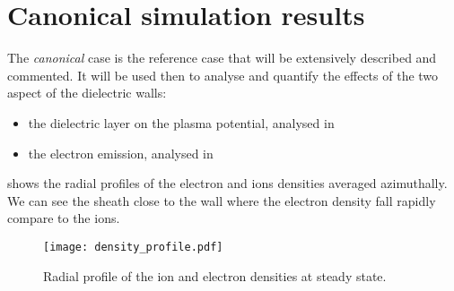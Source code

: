 
\section{Canonical simulation results}
  \label{sec-canonical}
  
  The {\it canonical} case is the reference case that will be extensively described and commented.
  It will be used then to analyse and quantify the effects of the two aspect of the dielectric walls:
  \begin{itemize}
    \item the dielectric layer on the plasma potential, analysed in  %
    \item the electron emission, analysed in %
  \end{itemize}
  
  
   shows the radial profiles of the electron and ions densities averaged azimuthally.
  We can see the sheath close to the wall where the electron density fall rapidly compare to the ions.
  
  
  \begin{figure}[hbtp]
    \centering
    \texttt{[image: density\_profile.pdf]}
    \caption{Radial profile of the ion and electron densities at steady state.}
    \label{fig-profiles}
  \end{figure}